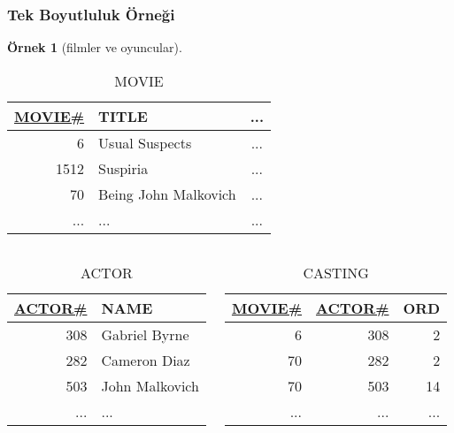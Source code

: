 \documentclass[dvipsnames]{beamer}
\theoremstyle{definition}
\theoremstyle{example}
\newtheorem{ornek}[theorem]{Örnek}
\theoremstyle{plain}
\begin{document}
\begin{frame}
  \frametitle{Tek Boyutluluk Örneği}

  \begin{ornek}[filmler ve oyuncular]
    \begin{tiny}
    \begin{table}
      \caption{MOVIE}
      \begin{tabular}{|r|l|c|}\hline
\underline{MOVIE\#} & TITLE                & ...\\[2pt]\hline\hline
                  6 & Usual Suspects       & ...\\\hline
               1512 & Suspiria             & ...\\\hline
                 70 & Being John Malkovich & ...\\\hline
                ... & ...                  & ...\\\hline
      \end{tabular}
    \end{table}
    \end{tiny}

    \begin{columns}[t]
      \begin{tiny}
      \begin{table}
        \caption{ACTOR}
        \begin{tabular}{|r|l|}\hline
\underline{ACTOR\#} & NAME          \\[2pt]\hline\hline
                308 & Gabriel Byrne \\\hline
                282 & Cameron Diaz  \\\hline
                503 & John Malkovich\\\hline
                ... & ...           \\\hline
        \end{tabular}
      \end{table}
      \end{tiny}

      \begin{tiny}
      \begin{table}
        \caption{CASTING}
        \begin{tabular}{|r|r|r|}\hline
\underline{MOVIE\#} & \underline{ACTOR\#} & ORD\\[2pt]\hline\hline
                  6 &                 308 &   2\\\hline
                 70 &                 282 &   2\\\hline
                 70 &                 503 &  14\\\hline
                ... &                 ... & ...\\\hline
        \end{tabular}
      \end{table}
      \end{tiny}
    \end{columns}
  \end{ornek}
\end{frame}
\end{document}
